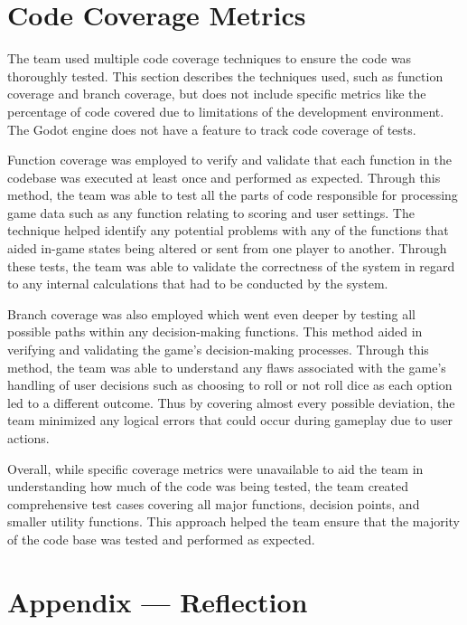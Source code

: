 \documentclass[12pt, titlepage]{article}
\begin{document}
\newpage
\section{Code Coverage Metrics}

The team used multiple code coverage techniques to ensure the code was thoroughly tested. This section describes the techniques used, such as function coverage and branch coverage, but does not include specific metrics like the percentage of code covered due to limitations of the development environment. The Godot engine does not have a feature to track code coverage of tests.

Function coverage was employed to verify and validate that each function in the codebase was executed at least once and performed as expected. Through this method, the team was able to test all the parts of code responsible for processing game data such as any function relating to scoring and user settings. The technique helped identify any potential problems with any of the functions that aided in-game states being altered or sent from one player to another. Through these tests, the team was able to validate the correctness of the system in regard to any internal calculations that had to be conducted by the system.  

Branch coverage was also employed which went even deeper by testing all possible paths within any decision-making functions. This method aided in verifying and validating the game's decision-making processes. Through this method, the team was able to understand any flaws associated with the game's handling of user decisions such as choosing to roll or not roll dice as each option led to a different outcome.  Thus by covering almost every possible deviation, the team minimized any logical errors that could occur during gameplay due to user actions.

Overall, while specific coverage metrics were unavailable to aid the team in understanding how much of the code was being tested, the team created comprehensive test cases covering all major functions, decision points, and smaller utility functions. This approach helped the team ensure that the majority of the code base was tested and performed as expected.

%
%

\newpage{}
\section*{Appendix --- Reflection}
\end{document}
